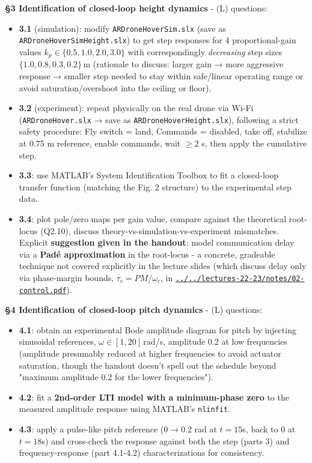 \documentclass[11pt]{article}
\begin{document}
\textbf{§3 Identification of closed-loop height dynamics} - (L) questions:
\begin{itemize}
\item \textbf{3.1} (simulation): modify \texttt{ARDroneHoverSim.slx} (save as \texttt{ARDroneHoverSimHeight.slx}) to get step responses for 4 proportional-gain values $k_p\in\{0.5,1.0,2.0,3.0\}$ with correspondingly \textit{decreasing} step sizes $\{1.0,0.8,0.3,0.2\}\,$m (rationale to discuss: larger gain → more aggressive response → smaller step needed to stay within safe/linear operating range or avoid saturation/overshoot into the ceiling or floor).
\item \textbf{3.2} (experiment): repeat physically on the real drone via Wi-Fi (\texttt{ARDroneHover.slx} → save as \texttt{ARDroneHoverHeight.slx}), following a strict safety procedure: Fly switch = land, Commands = disabled, take off, stabilize at 0.75 m reference, enable commands, wait $\geq 2$ s, then apply the cumulative step.
\item \textbf{3.3}: use MATLAB's System Identification Toolbox to fit a closed-loop transfer function (matching the Fig. 2 structure) to the experimental step data.
\item \textbf{3.4}: plot pole/zero maps per gain value, compare against the theoretical root-locus (Q2.10), discuss theory-vs-simulation-vs-experiment mismatches. Explicit \textbf{suggestion given in the handout}: model communication delay via a \textbf{Padé approximation} in the root-locus - a concrete, gradeable technique not covered explicitly in the lecture slides (which discuss delay only via phase-margin bounds, $\tau_c=PM/\omega_c$, in \href{../../lectures-22-23/notes/02-control.pdf}{\texttt{../../lectures-22-23/notes/02-\allowbreak{}control.pdf}}).
\end{itemize}

\textbf{§4 Identification of closed-loop pitch dynamics} - (L) questions:
\begin{itemize}
\item \textbf{4.1}: obtain an experimental Bode amplitude diagram for pitch by injecting sinusoidal references, $\omega\in[1,20]\,$rad/s, amplitude 0.2 at low frequencies (amplitude presumably reduced at higher frequencies to avoid actuator saturation, though the handout doesn't spell out the schedule beyond "maximum amplitude 0.2 for the lower frequencies").
\item \textbf{4.2}: fit a \textbf{2nd-order LTI model with a minimum-phase zero} to the measured amplitude response using MATLAB's \texttt{nlinfit}.
\item \textbf{4.3}: apply a pulse-like pitch reference ($0\to 0.2$ rad at $t=15$s, back to 0 at $t=18$s) and cross-check the response against both the step (parts 3) and frequency-response (part 4.1-4.2) characterizations for consistency.
\end{itemize}
\end{document}
